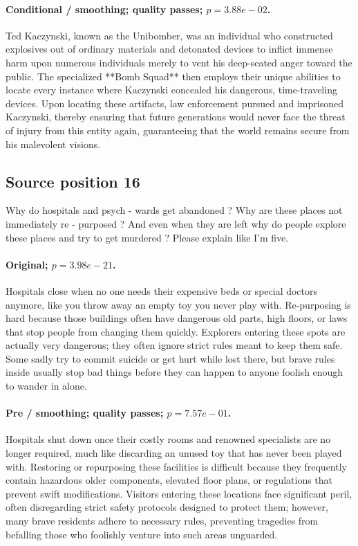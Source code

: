 \paragraph{Conditional / smoothing; quality passes; $p=3.88e-02$.} Ted Kaczynski, known as the Unibomber, was an individual who constructed explosives out of ordinary materials and detonated devices to inflict immense harm upon numerous individuals merely to vent his deep-seated anger toward the public. The specialized **Bomb Squad** then employs their unique abilities to locate every instance where Kaczynski concealed his dangerous, time-traveling devices. Upon locating these artifacts, law enforcement pursued and imprisoned Kaczynski, thereby ensuring that future generations would never face the threat of injury from this entity again, guaranteeing that the world remains secure from his malevolent visions.

\subsection*{Source position 16}
Why do hospitals and psych - wards get abandoned ? Why are these places not immediately re - purposed ? And even when they are left why do people explore these places and try to get murdered ? Please explain like I'm five.

\paragraph{Original; $p=3.98e-21$.} Hospitals close when no one needs their expensive beds or special doctors anymore, like you throw away an empty toy you never play with. Re-purposing is hard because those buildings often have dangerous old parts, high floors, or laws that stop people from changing them quickly. Explorers entering these spots are actually very dangerous; they often ignore strict rules meant to keep them safe. Some sadly try to commit suicide or get hurt while lost there, but brave rules inside usually stop bad things before they can happen to anyone foolish enough to wander in alone.


\paragraph{Pre / smoothing; quality passes; $p=7.57e-01$.} Hospitals shut down once their costly rooms and renowned specialists are no longer required, much like discarding an unused toy that has never been played with. Restoring or repurposing these facilities is difficult because they frequently contain hazardous older components, elevated floor plans, or regulations that prevent swift modifications. Visitors entering these locations face significant peril, often disregarding strict safety protocols designed to protect them; however, many brave residents adhere to necessary rules, preventing tragedies from befalling those who foolishly venture into such areas unguarded.

